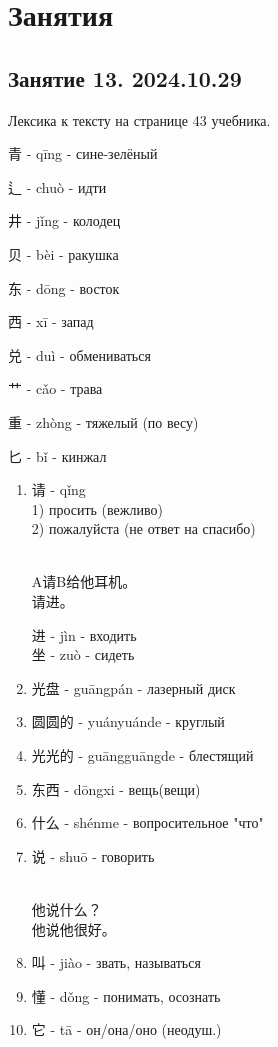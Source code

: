 \newpage
\section{Занятия}
\LARGE
\subsection{Занятие 13. 2024.10.29}
Лексика к тексту на странице 43 учебника.
\begin{newgraphems}\hfill
	\item 青 - qīng - сине-зелёный 
	\item 辶 - chuò - идти
	\item 井 - jǐng - колодец
	\item 贝 - bèi - ракушка
	\item 东 - dōng - восток
	\item 西 - xī - запад
	\item 兑 - duì - обмениваться
	\item 艹 - cǎo - трава
	\item 重 - zhòng - тяжелый (по весу)
	\item 匕 - bǐ - кинжал
\end{newgraphems}
\begin{newwords}\hfill
	\begin{enumerate}
		\item 
		请 - qǐng\\
		1) просить (вежливо)\\
		2) пожалуйста (не ответ на спасибо)
		\begin{example}\hfill\\
			A请B给他耳机。\\
			请进。
		\end{example}
		进 - jìn - входить\\
		坐 - zuò - сидеть
		\item
		光盘 - guāngpán - лазерный диск
		\item
		圆圆的 - yuányuánde - круглый
		\item 
		光光的 - guāngguāngde - блестящий
		\item 
		东西 - dōngxi - вещь(вещи)
		\item
		什么 - shénme - вопросительное "что"
		\item 
		说 - shuō - говорить
		\begin{example}\hfill\\
			他说什么？\\
			他说他很好。
		\end{example}
		\item 
		叫 - jiào - звать, называться
		\item 
		懂 - dǒng - понимать, осознать
		\item
		它 - tā - он/она/оно (неодуш.)
	\end{enumerate}
\end{newwords}
